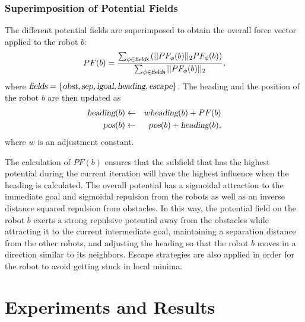 \documentclass[letterpaper, 10pt, conference]{ieeeconf}
\newcommand{\Var}[1]{\ensuremath{{\small{\textsl{#1}}}}}
\begin{document}
\subsubsection{Superimposition of Potential Fields}
\label{sec:All}
The different potential fields are superimposed to obtain the overall force
vector applied to the robot $b$: 
$$
PF(b) = \frac{\sum_{\phi \in \Var{fields}} \left(|| PF_\phi(b)||_2
  PF_\phi(b)\right)}{\sum_{\phi \in \Var{fields}} || PF_\phi(b)||_2},
$$
where $\Var{fields} = \{\Var{obst}, \Var{sep}, \Var{igoal},
\Var{heading}, \Var{escape}\}$.
The heading and the position of the robot $b$ are then updated as
\begin{eqnarray*}
\Var{heading}(b) &\leftarrow& w \Var{heading}(b) + PF(b)\\
\Var{pos}(b) &\leftarrow& \Var{pos}(b) + \Var{heading}(b),
\end{eqnarray*}
where $w$ is an adjustment constant. 

The calculation of $PF(b)$ ensures that the subfield that has the
highest potential during the current iteration will have the highest
influence when the heading is calculated. The overall potential has a
sigmoidal attraction to the immediate goal and sigmoidal repulsion
from the robots as well as an inverse distance squared repulsion from
obstacles. In this way, the potential field on the robot $b$ exerts a
strong repulsive potential away from the obstacles while attracting it
to the current intermediate goal, maintaining a separation distance
from the other robots, and adjusting the heading so that the robot $b$
moves in a direction similar to its neighbors. Escape strategies are
also applied in order for the robot to avoid getting stuck in local
minima.



\section{Experiments and Results}
\label{sec:ExpResults}
\end{document}
